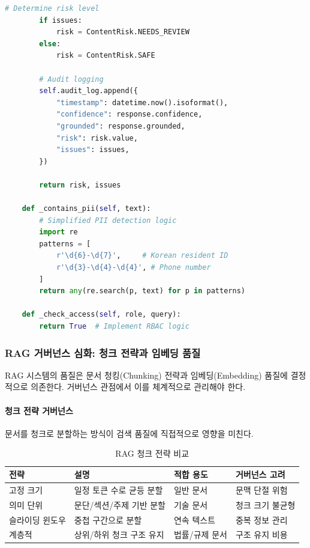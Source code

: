 \begin{lstlisting}[language=Python, caption={RAG 기반 생성형 AI 거버넌스 파이프라인}, label={lst:rag_governance}]
        # Determine risk level
        if issues:
            risk = ContentRisk.NEEDS_REVIEW
        else:
            risk = ContentRisk.SAFE

        # Audit logging
        self.audit_log.append({
            "timestamp": datetime.now().isoformat(),
            "confidence": response.confidence,
            "grounded": response.grounded,
            "risk": risk.value,
            "issues": issues,
        })

        return risk, issues

    def _contains_pii(self, text):
        # Simplified PII detection logic
        import re
        patterns = [
            r'\d{6}-\d{7}',     # Korean resident ID
            r'\d{3}-\d{4}-\d{4}', # Phone number
        ]
        return any(re.search(p, text) for p in patterns)

    def _check_access(self, role, query):
        return True  # Implement RBAC logic
\end{lstlisting}

\subsubsection{RAG 거버넌스 심화: 청크 전략과 임베딩 품질}

RAG 시스템의 품질은 문서 청킹(Chunking) 전략과 임베딩(Embedding) 품질에 결정적으로 의존한다. 거버넌스 관점에서 이를 체계적으로 관리해야 한다.

\paragraph{청크 전략 거버넌스}
문서를 청크로 분할하는 방식이 검색 품질에 직접적으로 영향을 미친다.

\begin{table}[htbp]
\centering
\caption{RAG 청크 전략 비교}
\label{tab:rag_chunking}
\begin{tabularx}{\textwidth}{p{2.5cm}Xp{2cm}p{2.5cm}}
\toprule
\textbf{전략} & \textbf{설명} & \textbf{적합 용도} & \textbf{거버넌스 고려} \\
\midrule
고정 크기 & 일정 토큰 수로 균등 분할 & 일반 문서 & 문맥 단절 위험 \\
의미 단위 & 문단/섹션/주제 기반 분할 & 기술 문서 & 청크 크기 불균형 \\
슬라이딩 윈도우 & 중첩 구간으로 분할 & 연속 텍스트 & 중복 정보 관리 \\
계층적 & 상위/하위 청크 구조 유지 & 법률/규제 문서 & 구조 유지 비용 \\
\bottomrule
\end{tabularx}
\end{table}

